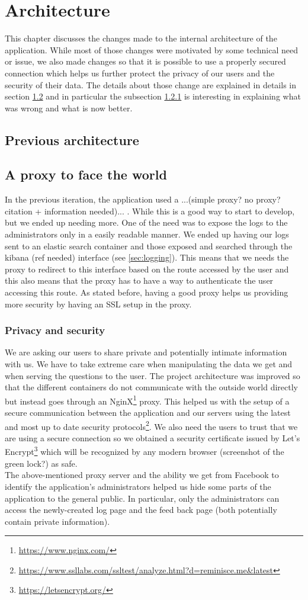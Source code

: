 \chapter{Architecture}
This chapter discusses the changes made to the internal architecture of the application. While most of those changes were motivated by some technical need or issue, we also made changes so that it is possible to use a properly secured connection which helps us further protect the privacy of our users and the security of their data. The details about those change are explained in details in section \ref{sec:proxy} and in particular the subsection \ref{subsec:privacy} is interesting in explaining what was wrong and what is now better.
\section{Previous architecture}
\section{A proxy to face the world}\label{sec:proxy}
In the previous iteration, the application used a ...(simple proxy? no proxy? citation + information needed)... . While this is a good way to start to develop, but we ended up needing more. One of the need was to expose the logs to the administrators only in a easily readable manner. We ended up having our logs sent to an elastic search container and those exposed and searched through the kibana (ref needed) interface (see \ref{sec:logging}). This means that we needs the proxy to redirect to this interface based on the route accessed by the user and this also means that the proxy has to have a way to authenticate the user accessing this route. As stated before, having a good proxy helps us providing more security by having an SSL setup in the proxy.
\subsection{Privacy and security}\label{subsec:privacy}
We are asking our users to share private and potentially intimate information with us. We have to take extreme care when manipulating the data we get and when serving the questions to the user. The project architecture was improved so that the different containers do not communicate with the outside world directly but instead goes through an NginX\footnote{\url{https://www.nginx.com/}} proxy. This helped us with the setup of a secure communication between the application and our servers using the latest and most up to date security protocols\footnote{\url{https://www.ssllabs.com/ssltest/analyze.html?d=reminisce.me&latest}}. We also need the users to trust that we are using a secure connection so we obtained a security certificate issued by Let's Encrypt\footnote{\url{https://letsencrypt.org/}} which will be recognized by any modern browser (screenshot of the green lock?) as safe.\\
The above-mentioned proxy server and the ability we get from Facebook to identify the application's administrators helped us hide some parts of the application to the general public. In particular, only the administrators can access the newly-created log page and the feed back page (both potentially contain private information).
